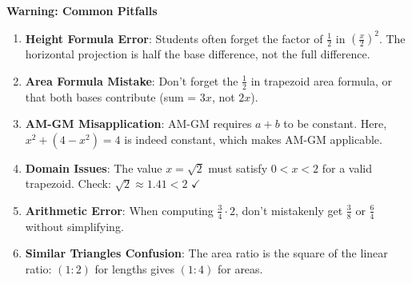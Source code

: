 \documentclass[12pt]{article}
\begin{document}
\begin{warningbox}
\textbf{Warning: Common Pitfalls}

\begin{enumerate}
    \item \textbf{Height Formula Error}: Students often forget the factor of $\frac{1}{2}$ in $\left(\frac{x}{2}\right)^2$. The horizontal projection is half the base difference, not the full difference.
    
    \item \textbf{Area Formula Mistake}: Don't forget the $\frac{1}{2}$ in trapezoid area formula, or that both bases contribute (sum = $3x$, not $2x$).
    
    \item \textbf{AM-GM Misapplication}: AM-GM requires $a + b$ to be constant. Here, $x^2 + (4-x^2) = 4$ is indeed constant, which makes AM-GM applicable.
    
    \item \textbf{Domain Issues}: The value $x = \sqrt{2}$ must satisfy $0 < x < 2$ for a valid trapezoid. Check: $\sqrt{2} \approx 1.41 < 2$ $\checkmark$
    
    \item \textbf{Arithmetic Error}: When computing $\frac{3}{4} \cdot 2$, don't mistakenly get $\frac{3}{8}$ or $\frac{6}{4}$ without simplifying.
    
    \item \textbf{Similar Triangles Confusion}: The area ratio is the square of the linear ratio: $(1:2)$ for lengths gives $(1:4)$ for areas.
\end{enumerate}
\end{warningbox}
\end{document}
